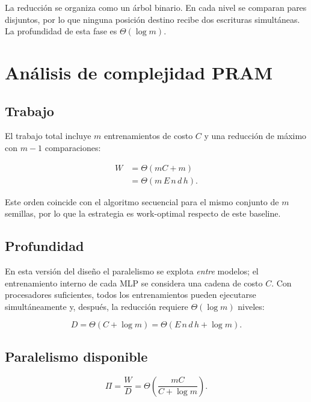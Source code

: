 \documentclass[11pt,a4paper]{article}
\newcommand{\Work}{W}
\newcommand{\Depth}{D}
\newcommand{\Cost}{C}
\begin{document}
La reducción se organiza como un árbol binario. En cada nivel se comparan pares
disjuntos, por lo que ninguna posición destino recibe dos escrituras simultáneas. La
profundidad de esta fase es $\Theta(\log m)$.

\section{Análisis de complejidad PRAM}

\subsection{Trabajo}

El trabajo total incluye $m$ entrenamientos de costo $\Cost$ y una reducción de máximo
con $m-1$ comparaciones:

\begin{align}
    \Work
    &= \Theta(m\Cost+m) \\
    &= \Theta(m\,E\,n\,d\,h).
    \label{eq:work}
\end{align}

Este orden coincide con el algoritmo secuencial para el mismo conjunto de $m$ semillas,
por lo que la estrategia es work-optimal respecto de este baseline.

\subsection{Profundidad}

En esta versión del diseño el paralelismo se explota \emph{entre} modelos; el
entrenamiento interno de cada MLP se considera una cadena de costo $\Cost$. Con
procesadores suficientes, todos los entrenamientos pueden ejecutarse simultáneamente y,
después, la reducción requiere $\Theta(\log m)$ niveles:

\begin{equation}
    \Depth=\Theta(\Cost+\log m)
    =\Theta(E\,n\,d\,h+\log m).
    \label{eq:depth}
\end{equation}

\subsection{Paralelismo disponible}

\begin{equation}
    \Pi=\frac{\Work}{\Depth}
    =\Theta\left(\frac{m\Cost}{\Cost+\log m}\right).
    \label{eq:parallelism}
\end{equation}
\end{document}
